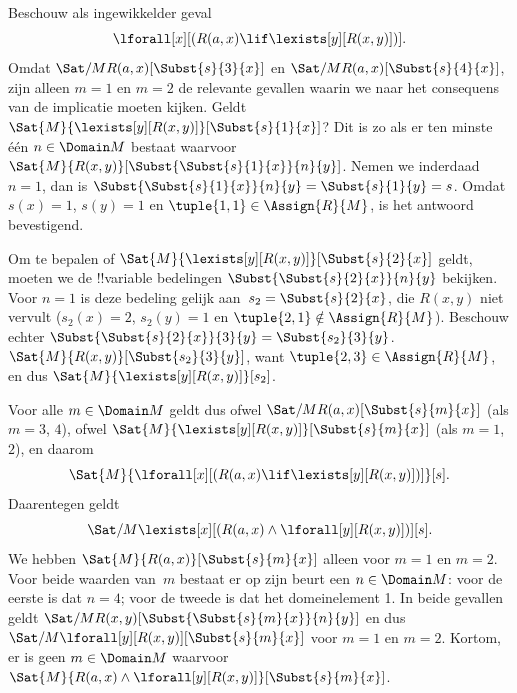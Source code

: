 \documentclass[openany]{memoir}
\begin{document}
\begin{ex}

Beschouw als ingewikkelder geval
\[
\lforall[x][(R(a,x) \lif \lexists[y][R(x,y)])].
\]
Omdat $\Sat/{M}{R(a,x)}[\Subst{s}{3}{x}]$ en
$\Sat/{M}{R(a,x)}[\Subst{s}{4}{x}]$, zijn alleen $m = 1$
en $m = 2$ de relevante gevallen waarin we naar het consequens van de
implicatie moeten kijken. Geldt $\Sat{M}{\lexists[y][R(x,y)]}[\Subst{s}{1}{x}]$?
Dit is zo als er ten minste één $n \in \Domain M$ bestaat waarvoor
$\Sat{M}{R(x,y)}[\Subst{\Subst{s}{1}{x}}{n}{y}]$. Nemen we inderdaad
$n = 1$, dan is $\Subst{\Subst{s}{1}{x}}{n}{y} = \Subst{s}{1}{y} =
s$. Omdat $s(x) = 1$, $s(y) = 1$ en $\tuple{1,1} \in \Assign{R}{M}$,
is het antwoord bevestigend.

Om te bepalen of $\Sat{M}{\lexists[y][R(x,y)]}[\Subst{s}{2}{x}]$ geldt,
moeten we de !!{variable} bedelingen
$\Subst{\Subst{s}{2}{x}}{n}{y}$ bekijken. Voor $n = 1$ is deze bedeling
gelijk aan~$s_2 = \Subst{s}{2}{x}$, die $R(x,y)$ niet vervult ($s_2(x) =
2$, $s_2(y) = 1$ en $\tuple{2,1}\notin \Assign{R}{M}$). Beschouw echter
$\Subst{\Subst{s}{2}{x}}{3}{y} = \Subst{s_2}{3}{y}$.
$\Sat{M}{R(x,y)}[\Subst{s_2}{3}{y}]$, want $\tuple{2,3} \in
\Assign{R}{M}$, en dus $\Sat{M}{\lexists[y][R(x,y)]}[s_2]$.

Voor alle $m \in \Domain M$ geldt dus ofwel
$\Sat/{M}{R(a,x)}[\Subst{s}{m}{x}]$ (als $m = 3$, $4$), ofwel
$\Sat{M}{\lexists[y][R(x,y)]}[\Subst{s}{m}{x}]$ (als $m = 1$, $2$), en daarom
\[
\Sat{M}{\lforall[x][(R(a,x) \lif \lexists[y][R(x,y)])]}[s].
\]
Daarentegen geldt
\[
\Sat/{M}{\lexists[x][(R(a,x) \land \lforall[y][R(x,y)])]}[s].
\]
We hebben $\Sat{M}{R(a,x)}[\Subst{s}{m}{x}]$ alleen voor $m = 1$ en $m =
2$. Voor beide waarden van~$m$ bestaat er op zijn beurt een $n \in
\Domain M$: voor de eerste is dat $n = 4$; voor de tweede is dat het
domeinelement 1. In beide gevallen geldt
$\Sat/{M}{R(x,y)}[\Subst{\Subst{s}{m}{x}}{n}{y}]$ en dus
$\Sat/{M}{\lforall[y][R(x,y)]}[\Subst{s}{m}{x}]$ voor $m = 1$ en $m =
2$. Kortom, er is geen $m \in \Domain M$ waarvoor $\Sat{M}{R(a,x)
\land \lforall[y][R(x,y)]}[\Subst{s}{m}{x}]$.
\end{ex}
\end{document}
